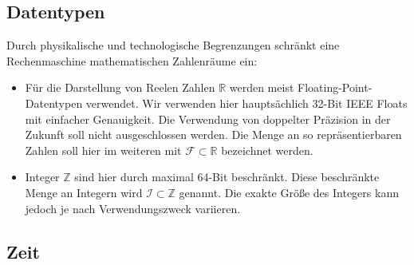
\subsection{Datentypen}
Durch physikalische und technologische Begrenzungen schränkt eine Rechenmaschine mathematischen Zahlenräume ein:
\begin{itemize}
\item Für die Darstellung von Reelen Zahlen $\mathbb{R}$ werden meist Floating-Point-Datentypen verwendet. Wir verwenden hier hauptsächlich 32-Bit IEEE Floats mit einfacher Genauigkeit. Die Verwendung von doppelter Präzision in der Zukunft soll nicht ausgeschlossen werden.
Die Menge an so repräsentierbaren Zahlen soll hier im weiteren mit $\mathcal{F} \subset \mathbb{R}$ bezeichnet werden.
\item Integer $\mathbb{Z}$ sind hier durch maximal 64-Bit beschränkt. Diese beschränkte Menge an Integern wird $\mathcal{I} \subset \mathbb{Z}$ genannt. Die exakte Größe des Integers kann jedoch je nach Verwendungszweck variieren.
\end{itemize}


\subsection{Zeit}
\label{sec:time}
\def\finite#1{\ooalign{\hfil$\mapstochar\mkern 3mu\mapstochar\mkern 5mu$\hfil\cr$#1$}}

